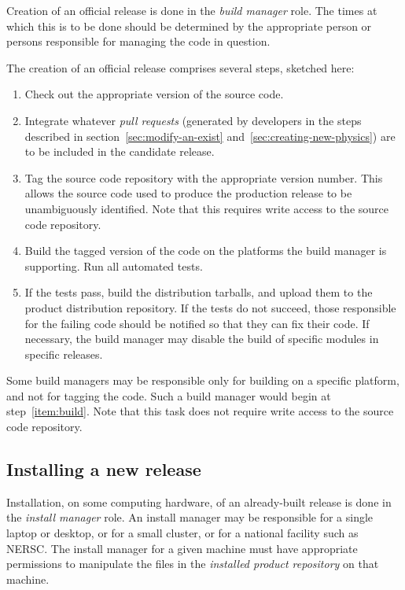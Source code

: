 \documentclass[draftmode,draftwater]{memarticle}
\begin{document}
Creation of an official release is done in the \emph{build manager}
role. The times at which this is to be done should be determined by the
appropriate person or persons responsible for managing the code in
question.

The creation of an official release comprises several steps, sketched
here:
\begin{enumerate}
\item Check out the appropriate version of the source code.
\item Integrate whatever \emph{pull requests} (generated by developers
  in the steps described in
  section~\ref{sec:modify-an-exist}
  and~\ref{sec:creating-new-physics}) are to be included in the
  candidate release.
\item Tag the source code repository with the appropriate version
  number. This allows the source code used to produce the production
  release to be unambiguously identified. Note that this requires write
  access to the source code repository.
\item \label{item:build} Build the tagged version of the code on the
  platforms the build manager is supporting. Run all automated tests.
\item If the tests pass, build the distribution tarballs, and upload
  them to the product distribution repository. If the tests do not
  succeed, those responsible for the failing code should be notified so
  that they can fix their code. If necessary, the build manager may
  disable the build of specific modules in specific releases.
\end{enumerate}

Some build managers may be responsible only for building on a specific
platform, and not for tagging the code. Such a build manager would begin
at step~\ref{item:build}. Note that this task does not require write
access to the source code repository.

\subsection{Installing a new release}

Installation, on some computing hardware, of an already-built release is
done in the \emph{install manager} role. An install manager may be
responsible for a single laptop or desktop, or for a small cluster, or
for a national facility such as NERSC. The install manager for a given
machine must have appropriate permissions to manipulate the files in the
\emph{installed product repository} on that machine.
\end{document}
